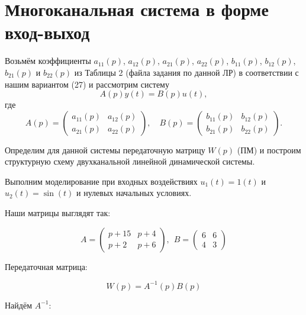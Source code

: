 \section{Многоканальная система в форме вход-выход}
Возьмём коэффициенты $a_{11}(p)$, $a_{12}(p)$, $a_{21}(p)$, $a_{22}(p)$, $b_{11}(p)$, $b_{12}(p)$, $b_{21}(p)$ и $b_{22}(p)$ из Таблицы 2 (файла задания по данной ЛР) в соответствии с нашим вариантом (27) и рассмотрим систему
$$
A(p)y(t) = B(p)u(t),
$$
где
$$
A(p) = \left(\begin{array}{cc}
a_{11}(p) & a_{12}(p) \\
a_{21}(p) & a_{22}(p)
\end{array}\right), \quad
B(p) = \left(\begin{array}{cc}
b_{11}(p) & b_{12}(p) \\
b_{21}(p) & b_{22}(p)
\end{array}\right).
$$

Определим для данной системы передаточную матрицу $W(p)$ (ПМ) и построим структурную схему двухканальной линейной динамической системы.

Выполним моделирование при входных воздействиях $u_1(t) = 1(t)$ и $u_2(t) = \sin(t)$ и нулевых начальных условиях.

\begin{par}
\begin{flushleft}
Наши матрицы выглядят так:
\end{flushleft}
\end{par}

\begin{par}
$$A=\left(\begin{array}{cc}
p+15 & p+4\\
p+2 & p+6
\end{array}\right),~~B=\left(\begin{array}{cc}
6 & 6\\
4 & 3
\end{array}\right)$$
\end{par}

\begin{par}
\begin{flushleft}
Передаточная матрица:
\end{flushleft}
\end{par}

\begin{par}
$$W(p)=A^{-1} (p)B(p)$$
\end{par}

\begin{par}
\begin{flushleft}
Найдём $A^{-1}$:
\end{flushleft}
\end{par}

